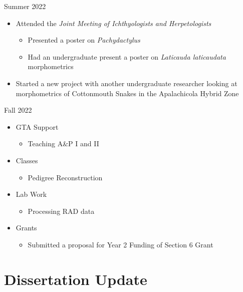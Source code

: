 \documentclass[10pt,aspectratio=169]{beamer}
\begin{document}
\begin{frame}{Summer 2022}
  \begin{itemize}
    \item Attended the \textit{Joint Meeting of Ichthyologists and Herpetologists}
    \begin{itemize}
      \item Presented a poster on \textit{Pachydactylus}
      \item Had an undergraduate present a poster on \textit{Laticauda laticaudata} morphometrics
    \end{itemize}
    \item Started a new project with another undergraduate researcher looking at morphometrics of Cottonmouth Snakes in the Apalachicola Hybrid Zone
  \end{itemize}
\end{frame}

\begin{frame}{Fall 2022}
  \begin{itemize}
    \item GTA Support
    \begin{itemize}
      \item Teaching A\&P I and II 
    \end{itemize}
    \item Classes
    \begin{itemize}
      \item Pedigree Reconstruction
    \end{itemize}
    \item Lab Work
    \begin{itemize}
      \item Processing RAD data
    \end{itemize}
    \item Grants
    \begin{itemize}
      \item Submitted a proposal for Year 2 Funding of Section 6 Grant
    \end{itemize}
    
  \end{itemize}
\end{frame}

\section[Dissertation Status]{Dissertation Update}
\end{document}
